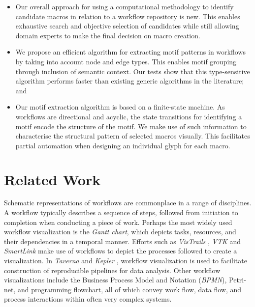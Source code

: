 \begin{itemize}
\vspace{-2mm}
\item Our overall approach for using a computational methodology to identify candidate macros in relation to a workflow repository is new. This enables exhaustive search and objective selection of candidates while still allowing domain experts to make the final decision on macro creation.
\vspace{-2mm}
\item We propose an efficient algorithm for extracting motif patterns in workflows by taking into account node and edge types. This enables motif grouping through inclusion of semantic context. Our tests show that this type-sensitive algorithm performs faster than existing generic algorithms in the literature; and
\vspace{-2mm}
\item
Our motif extraction algorithm is based on a finite-state machine.
As workflows are directional and acyclic, the state transitions for identifying a motif encode the structure of the motif. We make use of such information to characterise the structural pattern of selected macros visually. This facilitates partial automation when designing an individual glyph for each macro. 
\end{itemize}

\section{Related Work}
Schematic representations of workflows are commonplace in a range of disciplines.
A workflow typically describes a sequence of steps, followed from initiation to completion when conducting a piece of work.
Perhaps the most widely used workflow visualization is the \emph{Gantt chart}, which depicts tasks, resources, and their dependencies in a temporal manner.
Efforts such as \emph{VisTrails} \cite{callahanvistrails:2006}, \emph{VTK} \cite{schroederthe1996} and \emph{SmartLink} \cite{teleasmartlink:2000} make use of workflows to depict the processes followed to create a visualization.
In \emph{Taverna} \cite{hull06} and \emph{Kepler} \cite{altintaskepler:2004}, workflow visualization is used to facilitate construction of reproducible pipelines for data analysis.  
Other workflow visualizations include the Business Process Model and Notation (\emph{BPMN}), Petri-net, and programming flowchart, all of which convey work flow, data flow, and process interactions within often very complex systems. 

